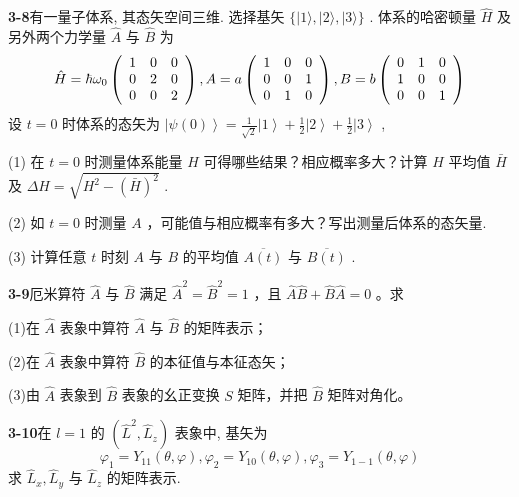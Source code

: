 \vfill

\newpage
\vfill

\noindent
\textbf{3-8}\quad 有一量子体系, 其态矢空间三维. 选择基矢 $\{|1\rangle, |2\rangle, |3\rangle\}$ . 体系的哈密顿量 $\hat{H}$ 及另外两个力学量 $\hat{A}$ 与 $\hat{B}$ 为
$$
\hat {H} = \hbar \omega_ {0} \left( \begin{array}{c c c} 1 & 0 & 0 \\ 0 & 2 & 0 \\ 0 & 0 & 2 \end{array} \right), A = a \left( \begin{array}{c c c} 1 & 0 & 0 \\ 0 & 0 & 1 \\ 0 & 1 & 0 \end{array} \right), B = b \left( \begin{array}{c c c} 0 & 1 & 0 \\ 1 & 0 & 0 \\ 0 & 0 & 1 \end{array} \right)
$$
设 $t = 0$ 时体系的态矢为 $\left|\psi(0)\right\rangle = \frac{1}{\sqrt{2}}\left|1\right\rangle + \frac{1}{2}\left|2\right\rangle + \frac{1}{2}\left|3\right\rangle$ , 

(1) 在 $t = 0$ 时测量体系能量 $H$ 可得哪些结果？相应概率多大？计算 $H$ 平均值 $\bar{H}$ 及 $\Delta H = \sqrt{H^2 - (\bar{H})^2}$ . 

(2) 如 $t = 0$ 时测量 $A$ ，可能值与相应概率有多大？写出测量后体系的态矢量. 

(3) 计算任意 $t$ 时刻 $A$ 与 $B$ 的平均值 $\overline{A(t)}$ 与 $\overline{B(t)}$ .

\vfill

\newpage
\vfill

\noindent
\textbf{3-9}\quad 厄米算符 $\hat{A}$ 与 $\hat{B}$ 满足 $\hat{A}^2 = \hat{B}^2 = 1$ ，且 $\hat{A}\hat{B} + \hat{B}\hat{A} = 0$ 。求

(1)在 $\hat{A}$ 表象中算符 $\hat{A}$ 与 $\hat{B}$ 的矩阵表示；

(2)在 $\hat{A}$ 表象中算符 $\hat{B}$ 的本征值与本征态矢；

(3)由 $\hat{A}$ 表象到 $\hat{B}$ 表象的幺正变换 $S$ 矩阵，并把 $\hat{B}$ 矩阵对角化。

\vfill

\newpage
\vfill

\noindent
\textbf{3-10}\quad 在 $l = 1$ 的 $(\hat{L}^2, \hat{L}_z)$ 表象中, 基矢为
$$
\varphi_ {1} = Y _ {1 1} (\theta , \varphi), \varphi_ {2} = Y _ {1 0} (\theta , \varphi), \varphi_ {3} = Y _ {1 - 1} (\theta , \varphi)
$$
求 $\hat{L}_x, \hat{L}_y$ 与 $\hat{L}_z$ 的矩阵表示.

